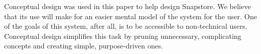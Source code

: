 Conceptual design was used in this paper to help design Snapstore. We believe that its use will make for an easier mental model of the system for the user. One of the goals of this system, after all, is to be accessible to non-technical users. Conceptual design simplifies this task by pruning unnecessary, complicating concepts and creating simple, purpose-driven ones.



